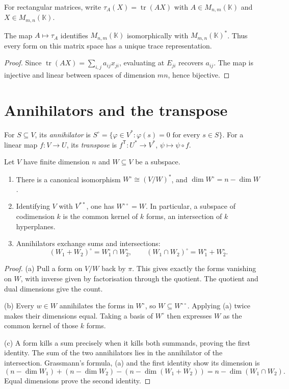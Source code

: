 For rectangular matrices, write $\tau_A(X)=\operatorname{tr}(AX)$ with $A\in M_{n,m}(\mathbb K)$ and $X\in M_{m,n}(\mathbb K)$.
\begin{proposition}\label{linear:prop:trace}
The map $A\mapsto\tau_A$ identifies $M_{n,m}(\mathbb K)$ isomorphically with $M_{m,n}(\mathbb K)^*$. Thus every form on this matrix space has a unique trace representation.
\end{proposition}
\begin{proof}
Since $\operatorname{tr}(AX)=\sum_{i,j}a_{ij}x_{ji}$, evaluating at $E_{ji}$ recovers $a_{ij}$. The map is injective and linear between spaces of dimension $mn$, hence bijective.
\end{proof}

\section{Annihilators and the transpose}\label{linear:sec:transpose}
\begin{definition}
For $S\subseteq V$, its \emph{annihilator} is $S^\circ=\{\varphi\in V^*:\varphi(s)=0\text{ for every }s\in S\}$. For a linear map $f:V\to U$, its \emph{transpose} is $f^{\mathsf T}:U^*\to V^*$, $\psi\mapsto\psi\circ f$.
\end{definition}

\begin{theorem}[annihilators]\label{linear:thm:annihilator}
Let $V$ have finite dimension $n$ and $W\subseteq V$ be a subspace.
\begin{enumerate}[label=(\alph*)]
\item There is a canonical isomorphism $W^\circ\cong(V/W)^*$, and $\dim W^\circ=n-\dim W$.
\item Identifying $V$ with $V^{**}$, one has $W^{\circ\circ}=W$. In particular, a subspace of codimension $k$ is the common kernel of $k$ forms, an intersection of $k$ hyperplanes.
\item Annihilators exchange sums and intersections:
\[(W_1+W_2)^\circ=W_1^\circ\cap W_2^\circ,\qquad
(W_1\cap W_2)^\circ=W_1^\circ+W_2^\circ.\]
\end{enumerate}
\end{theorem}
\begin{proof}
(a) Pull a form on $V/W$ back by $\pi$. This gives exactly the forms vanishing on $W$, with inverse given by factorisation through the quotient. The quotient and dual dimensions give the count.

(b) Every $w\in W$ annihilates the forms in $W^\circ$, so $W\subseteq W^{\circ\circ}$. Applying (a) twice makes their dimensions equal. Taking a basis of $W^\circ$ then expresses $W$ as the common kernel of those $k$ forms.

(c) A form kills a sum precisely when it kills both summands, proving the first identity. The sum of the two annihilators lies in the annihilator of the intersection. Grassmann's formula, (a) and the first identity show its dimension is
\[(n-\dim W_1)+(n-\dim W_2)-(n-\dim(W_1+W_2))
 =n-\dim(W_1\cap W_2).
\]
Equal dimensions prove the second identity.
\end{proof}

